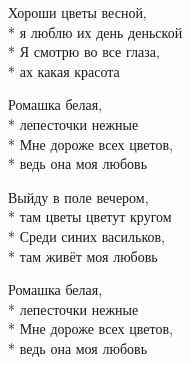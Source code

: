 \medskip

\begin{minipage}{\linewidth}
Хороши цветы весной,\\*
я люблю их день деньской\\*
Я смотрю во все глаза,\\*
ах какая красота\\
\end{minipage}\par\medskip\nobreak

\medskip

\begin{minipage}{\linewidth}
\hspace*{1.5em}Ромашка белая,\\*
\hspace*{1.5em}лепесточки нежные\\*
\hspace*{1.5em}Мне дороже всех цветов,\\*
\hspace*{1.5em}ведь она моя любовь\\
\end{minipage}\par\medskip\nobreak

\medskip

\begin{minipage}{\linewidth}
Выйду в поле вечером,\\*
там цветы цветут кругом\\*
Среди синих васильков,\\*
там живёт моя любовь\\
\end{minipage}\par\medskip\nobreak

\medskip

\begin{minipage}{\linewidth}
\hspace*{1.5em}Ромашка белая,\\*
\hspace*{1.5em}лепесточки нежные\\*
\hspace*{1.5em}Мне дороже всех цветов,\\*
\hspace*{1.5em}ведь она моя любовь\\
\end{minipage}\par\medskip\nobreak

\medskip

